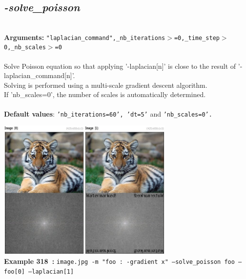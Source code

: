\documentclass[a4paper,11pt,twoside]{book}
\begin{document}
\subsection{\emph{-solve\_poisson} }\vspace*{-0.5em}
~\\\textbf{Arguments: } 
{\small \texttt{"laplacian\_command",\_nb\_iterations$>$=0,\_time\_step$>$0,\_nb\_scales$>$=0}}\\~\\
Solve Poisson equation so that applying '-laplacian[n]' is close to the result of '-laplacian\_command[n]'.
~\\Solving is performed using a multi-scale gradient descent algorithm.
~\\If 'nb\_scales=0', the number of scales is automatically determined.
~\\~\\\textbf{Default values}: {\small \texttt{'nb\_iterations=60', 'dt=5'} and \texttt{'nb\_scales=0'.}}
\begin{center}\includegraphics[keepaspectratio=true,height=7cm,width=\textwidth]{img/gmic_def318.jpg}\\
{\footnotesize \textbf{Example 318~:} \texttt{image.jpg -m "foo : -gradient x" --solve\_poisson foo --foo[0] --laplacian[1]}}
\end{center}
\end{document}

